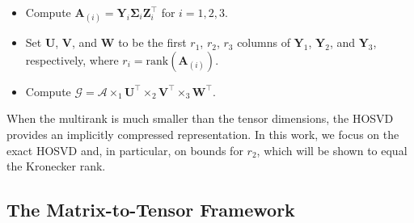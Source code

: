 \documentclass{siamart251216}
\newcommand{\tens}[1]{\mathbf{\mathcal{#1}}}
\newcommand{\munfold}[2]{\mathbf{#1}_{(#2)}}
\def\bU{\mathbf{U}}
\def\bV{\mathbf{V}}
\def\bW{\mathbf{W}}
\def\bY{\mathbf{Y}}
\def\bZ{\mathbf{Z}}
\def\bSigma{\mathbf{\Sigma}}
\begin{document}
\begin{algorithm}
    \caption{HOSVD~}
    \label{alg:hosvd}
    \begin{itemize}
        \item Compute $\munfold{A}{i} = \bY_i\bSigma_i\bZ_i^\top$ for $i=1,2,3$.
        \item Set $\bU$, $\bV$, and $\bW$ to be the first $r_1$, $r_2$, $r_3$ columns of
              $\bY_1$, $\bY_2$, and $\bY_3$, respectively, where $r_i = \mathrm{rank}(\munfold{A}{i})$.
        \item Compute $\tens{G} = \tens{A}\times_1\bU^\top\times_2\bV^\top\times_3\bW^\top$.
    \end{itemize}
\end{algorithm}

When the multirank is much smaller than the tensor dimensions, the HOSVD provides an implicitly
compressed representation.  In this work, we focus on the exact HOSVD and, in particular, on
bounds for $r_2$, which will be shown to equal the Kronecker rank.

\subsection{The Matrix-to-Tensor Framework}
\label{sec:mtt}
\end{document}
